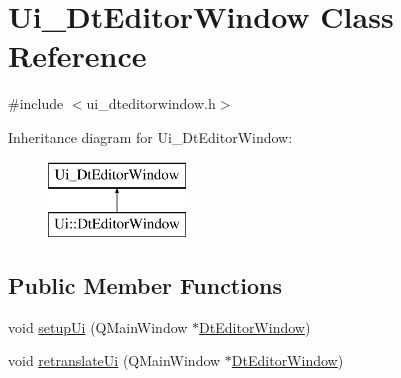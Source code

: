 \hypertarget{class_ui___dt_editor_window}{}\section{Ui\+\_\+\+Dt\+Editor\+Window Class Reference}
\label{class_ui___dt_editor_window}


{\ttfamily \#include $<$ui\+\_\+dteditorwindow.\+h$>$}

Inheritance diagram for Ui\+\_\+\+Dt\+Editor\+Window\+:\begin{figure}[H]
\begin{center}
\leavevmode
\includegraphics[height=2.000000cm]{dd/dcb/class_ui___dt_editor_window}
\end{center}
\end{figure}
\subsection*{Public Member Functions}
\begin{DoxyCompactItemize}
\item 
void \mbox{\hyperlink{class_ui___dt_editor_window_a49f8bbaedf06180a3e87d1eeff7dbe5a}{setup\+Ui}} (Q\+Main\+Window $\ast$\mbox{\hyperlink{class_dt_editor_window}{Dt\+Editor\+Window}})
\item 
void \mbox{\hyperlink{class_ui___dt_editor_window_a8e7546afa21139ce59e2411e19c7b3ec}{retranslate\+Ui}} (Q\+Main\+Window $\ast$\mbox{\hyperlink{class_dt_editor_window}{Dt\+Editor\+Window}})
\end{DoxyCompactItemize}
